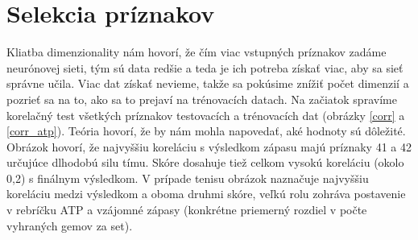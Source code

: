 \section{Selekcia príznakov}
Kliatba dimenzionality nám hovorí, že čím viac vstupných príznakov zadáme neurónovej sieti, tým sú data redšie a teda je ich potreba získať viac, aby sa sieť správne učila. Viac dat získať nevieme, takže sa pokúsime znížiť počet dimenzií a pozrieť sa na to, ako sa to prejaví na trénovacích datach.
Na začiatok spravíme korelačný test všetkých príznakov testovacích a trénovacích dat (obrázky \ref{corr} a \ref{corr_atp}).
Teória hovorí, že by nám mohla napovedať, aké hodnoty sú dôležité.
Obrázok hovorí, že najvyššiu koreláciu s výsledkom zápasu majú príznaky 41 a 42 určujúce dlhodobú silu tímu. Skóre dosahuje tiež celkom vysokú koreláciu (okolo 0,2) s finálnym výsledkom.
V prípade tenisu obrázok naznačuje najvyššiu koreláciu medzi výsledkom a oboma druhmi skóre, veľkú rolu zohráva postavenie v rebríčku ATP a vzájomné zápasy (konkrétne priemerný rozdiel v počte vyhraných gemov za set).

